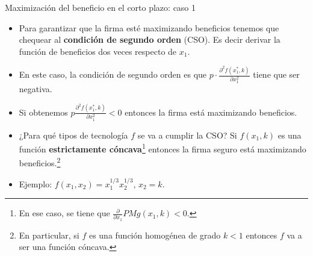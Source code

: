 \documentclass{beamer}
\theoremstyle{definition}
\begin{document}
	\begin{frame}{Maximización del beneficio en el corto plazo: caso 1}\small
	\begin{itemize}
	
	\item Para garantizar que la firma esté maximizando beneficios tenemos que chequear al \textbf{condición de segundo orden} (CSO). Es decir derivar la función de beneficios dos veces respecto de $x_1$.
	
	\item En este caso, la condición de segundo orden es que $p\cdot \frac{\partial^{2} f(x_{1}^*,k)}{\partial x_{1}^{2}}$ tiene que ser negativa.
	
	\item Si obtenemos  $p\frac{\partial^{2} f(x_{1}^*,k)}{\partial x_{1}^{2}} < 0$ entonces la firma está maximizando beneficios.
	
	
	\item ¿Para qué tipos de tecnología $f$ se va a cumplir la CSO? Si $f(x_1,k)$ es una función \textbf{estrictamente cóncava}\footnote{En ese caso, se tiene que $\frac{\partial}{\partial x_1} PMg(x_1,k)<0$.} entonces la firma seguro está maximizando beneficios.\footnote{En particular, si $f$ es una función homogénea de grado $k<1$ entonces $f$ va a ser una función cóncava.} 
	
	\item Ejemplo: $f(x_1,x_2)=x_1^{1/3}x_2^{1/3}$, $x_2=k$.
	
\end{itemize}
\end{frame}
\end{document}
